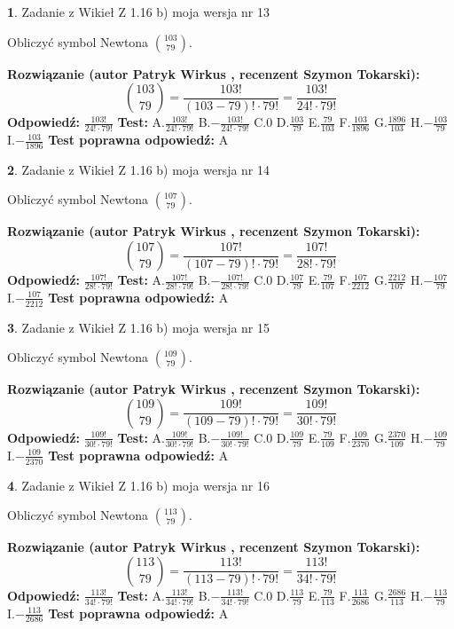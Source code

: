 \documentclass[12pt, a4paper]{article}
\theoremstyle{definition} %
\newtheorem{zad}{}
\newcommand{\zadStart}[1]{\begin{zad}#1\newline}
\newcommand{\zadStop}{\end{zad}}
\newcommand{\rozwStart}[2]{\noindent \textbf{Rozwiązanie (autor #1 , recenzent #2): }\newline}
\newcommand{\rozwStop}{\newline}
\newcommand{\odpStart}{\noindent \textbf{Odpowiedź:}\newline}
\newcommand{\odpStop}{\newline}
\newcommand{\testStart}{\noindent \textbf{Test:}\newline}
\newcommand{\testStop}{\newline}
\newcommand{\kluczStart}{\noindent \textbf{Test poprawna odpowiedź:}\newline}
\newcommand{\kluczStop}{\newline}
\begin{document}
\zadStart{Zadanie z Wikieł Z 1.16 b) moja wersja nr 13}

Obliczyć symbol Newtona ${103 \choose 79}$.
\zadStop
\rozwStart{Patryk Wirkus}{Szymon Tokarski}
$${103 \choose 79} = \frac{103!}{(103-79)! \cdot 79!} = \frac{103!}{24! \cdot 79!}$$
\rozwStop
\odpStart
$\frac{103!}{24! \cdot 79!}$
\odpStop
\testStart
A.$\frac{103!}{24! \cdot 79!}$ B.$-\frac{103!}{24! \cdot 79!}$ C.$0$ D.$\frac{103}{79}$ E.$\frac{79}{103}$
F.$\frac{103}{1896}$ G.$\frac{1896}{103}$
H.$-\frac{103}{79}$
I.$-\frac{103}{1896}$
\testStop
\kluczStart
A
\kluczStop



\zadStart{Zadanie z Wikieł Z 1.16 b) moja wersja nr 14}

Obliczyć symbol Newtona ${107 \choose 79}$.
\zadStop
\rozwStart{Patryk Wirkus}{Szymon Tokarski}
$${107 \choose 79} = \frac{107!}{(107-79)! \cdot 79!} = \frac{107!}{28! \cdot 79!}$$
\rozwStop
\odpStart
$\frac{107!}{28! \cdot 79!}$
\odpStop
\testStart
A.$\frac{107!}{28! \cdot 79!}$ B.$-\frac{107!}{28! \cdot 79!}$ C.$0$ D.$\frac{107}{79}$ E.$\frac{79}{107}$
F.$\frac{107}{2212}$ G.$\frac{2212}{107}$
H.$-\frac{107}{79}$
I.$-\frac{107}{2212}$
\testStop
\kluczStart
A
\kluczStop



\zadStart{Zadanie z Wikieł Z 1.16 b) moja wersja nr 15}

Obliczyć symbol Newtona ${109 \choose 79}$.
\zadStop
\rozwStart{Patryk Wirkus}{Szymon Tokarski}
$${109 \choose 79} = \frac{109!}{(109-79)! \cdot 79!} = \frac{109!}{30! \cdot 79!}$$
\rozwStop
\odpStart
$\frac{109!}{30! \cdot 79!}$
\odpStop
\testStart
A.$\frac{109!}{30! \cdot 79!}$ B.$-\frac{109!}{30! \cdot 79!}$ C.$0$ D.$\frac{109}{79}$ E.$\frac{79}{109}$
F.$\frac{109}{2370}$ G.$\frac{2370}{109}$
H.$-\frac{109}{79}$
I.$-\frac{109}{2370}$
\testStop
\kluczStart
A
\kluczStop



\zadStart{Zadanie z Wikieł Z 1.16 b) moja wersja nr 16}

Obliczyć symbol Newtona ${113 \choose 79}$.
\zadStop
\rozwStart{Patryk Wirkus}{Szymon Tokarski}
$${113 \choose 79} = \frac{113!}{(113-79)! \cdot 79!} = \frac{113!}{34! \cdot 79!}$$
\rozwStop
\odpStart
$\frac{113!}{34! \cdot 79!}$
\odpStop
\testStart
A.$\frac{113!}{34! \cdot 79!}$ B.$-\frac{113!}{34! \cdot 79!}$ C.$0$ D.$\frac{113}{79}$ E.$\frac{79}{113}$
F.$\frac{113}{2686}$ G.$\frac{2686}{113}$
H.$-\frac{113}{79}$
I.$-\frac{113}{2686}$
\testStop
\kluczStart
A
\kluczStop
\end{document}
